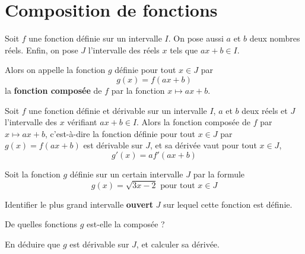 \documentclass{article}
\begin{document}
\section{Composition de fonctions}
\begin{tcolorbox}
\begin{definition}
Soit $f$ une fonction définie sur un intervalle $I$. On pose aussi $a$ et $b$ deux nombres réels. Enfin, on pose $J$ l'intervalle des réels $x$ tels que $ax+b \in I$. 

Alors on appelle la fonction $g$ définie pour tout $x \in J$ par
\begin{equation*}
g(x) = f(ax+b)
\end{equation*}
la \textbf{fonction composée} de $f$ par la fonction $x \mapsto ax + b$.
\end{definition}
\end{tcolorbox}
\begin{proposition}
Soit $f$ une fonction définie et dérivable sur un intervalle $I$, $a$ et $b$ deux réels et $J$ l'intervalle des $x$ vérifiant $ax+b \in I$. Alors la fonction composée de $f$ par $x \mapsto ax + b$, c'est-à-dire la fonction définie pour tout $x \in J$ par $g(x) = f(ax+b)$ est dérivable sur $J$, et sa dérivée vaut pour tout $x \in J$,
\begin{equation*}
g'(x) = af'(ax+b)
\end{equation*}
\end{proposition}
\begin{example}
Soit la fonction $g$ définie sur un certain intervalle $J$ par la formule
\begin{equation*}
g(x) = \sqrt{3x - 2} \text{ pour tout } x \in J
\end{equation*}
\begin{enumquestions}
\item Identifier le plus grand intervalle \textbf{ouvert} $J$ sur lequel cette fonction est définie.

\vspace*{0.2cm}
\emptybox{2cm}
\item De quelles fonctions $g$ est-elle la composée ?

\vspace*{0.2cm}
\emptybox{2cm}
\item En déduire que $g$ est dérivable sur $J$, et calculer sa dérivée.

\vspace*{0.2cm}
\emptybox{4cm}
\end{enumquestions}
\end{example}
\newpage
\end{document}
